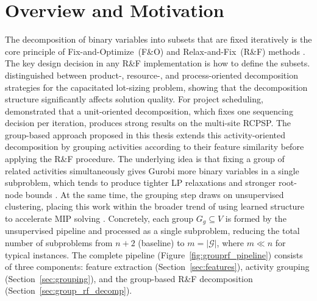 \section{Overview and Motivation}
\label{sec:grouprf_overview}
The decomposition of binary variables into subsets that are fixed
iteratively is the core principle of Fix-and-Optimize~(F\&O) and
Relax-and-Fix~(R\&F) methods \parencite{pochet2006, Helber2010}. The
key design decision in any R\&F implementation is how to define
the subsets. \textcite{Helber2010} distinguished between product-,
resource-, and process-oriented decomposition strategies for the
capacitated lot-sizing problem, showing that the decomposition
structure significantly affects solution quality. For project
scheduling, \textcite{bigler2024multisite} demonstrated that a unit-oriented
decomposition, which fixes one sequencing decision per iteration,
produces strong results on the multi-site RCPSP.
The group-based approach proposed in this thesis extends this
activity-oriented decomposition by grouping activities according
to their feature similarity before applying the R\&F procedure.
The underlying idea is that fixing a group of related activities
simultaneously gives Gurobi more binary variables in
a single subproblem, which tends to produce tighter LP relaxations
and stronger root-node bounds \parencite{pochet2006}. At the same
time, the grouping step draws on unsupervised clustering, placing
this work within the broader trend of using learned structure to
accelerate MIP solving \parencite{bengio2021}.
Concretely, each group $G_g \subseteq V$ is formed by the
unsupervised pipeline and processed as a single subproblem,
reducing the total number of subproblems from $n+2$ (baseline)
to $m = |\mathcal{G}|$, where $m \ll n$ for typical instances.
The complete pipeline (Figure~\ref{fig:grouprf_pipeline})
consists of three components: feature extraction
(Section~\ref{sec:features}), activity grouping
(Section~\ref{sec:grouping}), and the group-based R\&F
decomposition (Section~\ref{sec:group_rf_decomp}).
